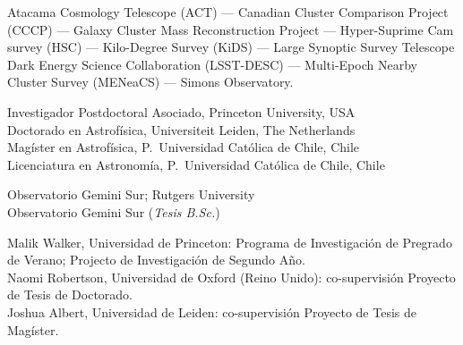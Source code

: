 \documentclass[11pt]{article}
\begin{document}
\vspace{0.5cm}
{
 Atacama Cosmology Telescope (ACT) ---
 Canadian Cluster Comparison Project (CCCP) ---
 Galaxy Cluster Mass Reconstruction Project ---
 Hyper-Suprime Cam survey (HSC) ---
 Kilo-Degree Survey (KiDS) ---
 Large Synoptic Survey Telescope Dark Energy Science Collaboration (LSST-DESC) ---
 Multi-Epoch Nearby Cluster Survey (MENeaCS) ---
 Simons Observatory.
}



\noindent
{} Investigador Postdoctoral Asociado, Princeton University, USA\\
 Doctorado en Astrof\'isica, Universiteit Leiden, The Netherlands\\
 Mag\'ister en Astrof\'isica, P.~Universidad Cat\'olica de Chile, Chile\\
 Licenciatura en Astronom\'ia, P.~Universidad Cat\'olica de Chile, Chile



\noindent
{} Observatorio Gemini Sur; Rutgers University\\
 Observatorio Gemini Sur (\emph{Tesis B.Sc.})\\




\noindent
{} Malik Walker, Universidad de Princeton: Programa de Investigaci\'on de Pregrado de Verano; Projecto de Investigaci\'on de Segundo A\~no.\\
 Naomi Robertson, Universidad de Oxford (Reino Unido): co-supervisi\'on Proyecto de Tesis de Doctorado.\\
 Joshua Albert, Universidad de Leiden: co-supervisi\'on Proyecto de Tesis de Mag\'ister.

\end{document}
